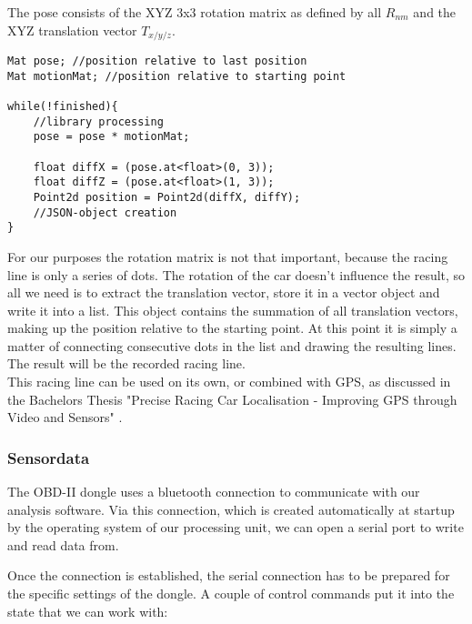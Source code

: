 The pose consists of the XYZ 3x3 rotation matrix as defined by all $R_{nm}$ and the XYZ translation vector $T_{x/y/z}$. 
\clearpage
\begin{lstlisting}
Mat pose; //position relative to last position
Mat motionMat; //position relative to starting point

while(!finished){
	//library processing
	pose = pose * motionMat;

	float diffX = (pose.at<float>(0, 3));
	float diffZ = (pose.at<float>(1, 3));
	Point2d position = Point2d(diffX, diffY);
	//JSON-object creation 
}
\end{lstlisting}

For our purposes the rotation matrix is not that important, because the racing line is only a series of dots. The rotation of the car doesn't influence the result, so all we need is to extract the translation vector, store it in a vector object and write it into a list. This object contains the summation of all translation vectors, making up the position relative to the starting point.
At this point it is simply a matter of connecting consecutive dots in the list and drawing the resulting lines. The result will be the recorded racing line.\\
This racing line can be used on its own, or combined with GPS, as discussed in the Bachelors Thesis "Precise Racing Car Localisation - Improving GPS through Video and Sensors" \cite{hoffmann16}.

\subsubsection{Sensordata}
The OBD-II dongle uses a bluetooth connection to communicate with our analysis software. Via this connection, which is created automatically at startup by the operating system of our processing unit, we can open a serial port to write and read data from.

Once the connection is established, the serial connection has to be prepared for the specific settings of the dongle.
A couple of control commands put it into the state that we can work with: 

